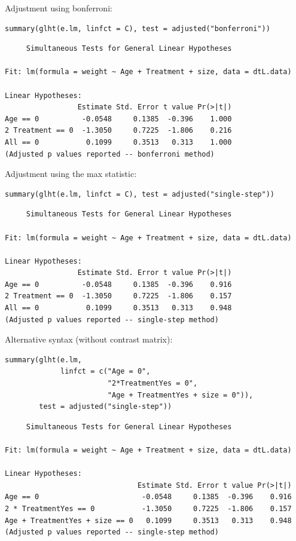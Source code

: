 \documentclass{article}
\begin{document}
Adjustment using bonferroni:
\lstset{language=r,label= ,caption= ,captionpos=b,numbers=none}
\begin{lstlisting}
summary(glht(e.lm, linfct = C), test = adjusted("bonferroni"))
\end{lstlisting}

\begin{verbatim}
	 Simultaneous Tests for General Linear Hypotheses

Fit: lm(formula = weight ~ Age + Treatment + size, data = dtL.data)

Linear Hypotheses:
                 Estimate Std. Error t value Pr(>|t|)
Age == 0          -0.0548     0.1385  -0.396    1.000
2 Treatment == 0  -1.3050     0.7225  -1.806    0.216
All == 0           0.1099     0.3513   0.313    1.000
(Adjusted p values reported -- bonferroni method)
\end{verbatim}

Adjustment using the max statistic:
\lstset{language=r,label= ,caption= ,captionpos=b,numbers=none}
\begin{lstlisting}
summary(glht(e.lm, linfct = C), test = adjusted("single-step"))
\end{lstlisting}

\begin{verbatim}
	 Simultaneous Tests for General Linear Hypotheses

Fit: lm(formula = weight ~ Age + Treatment + size, data = dtL.data)

Linear Hypotheses:
                 Estimate Std. Error t value Pr(>|t|)
Age == 0          -0.0548     0.1385  -0.396    0.916
2 Treatment == 0  -1.3050     0.7225  -1.806    0.157
All == 0           0.1099     0.3513   0.313    0.948
(Adjusted p values reported -- single-step method)
\end{verbatim}

Alternative syntax (without contrast matrix):
\lstset{language=r,label= ,caption= ,captionpos=b,numbers=none}
\begin{lstlisting}
summary(glht(e.lm, 
			 linfct = c("Age = 0",
						"2*TreatmentYes = 0",
						"Age + TreatmentYes + size = 0")), 
		test = adjusted("single-step"))
\end{lstlisting}

\begin{verbatim}
	 Simultaneous Tests for General Linear Hypotheses

Fit: lm(formula = weight ~ Age + Treatment + size, data = dtL.data)

Linear Hypotheses:
                               Estimate Std. Error t value Pr(>|t|)
Age == 0                        -0.0548     0.1385  -0.396    0.916
2 * TreatmentYes == 0           -1.3050     0.7225  -1.806    0.157
Age + TreatmentYes + size == 0   0.1099     0.3513   0.313    0.948
(Adjusted p values reported -- single-step method)
\end{verbatim}
\end{document}
